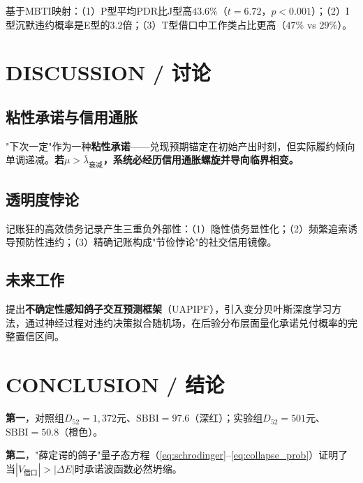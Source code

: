 \documentclass[journal]{IEEEtran}
\newcommand{\citet}[1]{\cite{#1}}
\begin{document}
基于MBTI映射：（1）P型平均$\text{PDR}$比J型高$43.6\%$（$t=6.72$，$p<0.001$）；（2）I型沉默违约概率是E型的$3.2$倍；（3）T型借口中工作类占比更高（$47\%$ vs $29\%$）。

\section{DISCUSSION / 讨论}

\subsection{粘性承诺与信用通胀}

"下次一定"作为一种\textbf{粘性承诺}——兑现预期锚定在初始产出时刻，但实际履约倾向单调递减。\textbf{若$\mu > \bar{\lambda}_{\text{衰减}}$，系统必经历信用通胀螺旋并导向临界相变。}

\subsection{透明度悖论}

记账狂的高效债务记录产生三重负外部性：（1）隐性债务显性化；（2）频繁追索诱导预防性违约；（3）精确记账构成"节俭悖论"\citet{keynes_thrift}的社交信用镜像。

\subsection{未来工作}

提出\textbf{不确定性感知鸽子交互预测框架}（UAPIPF），引入变分贝叶斯深度学习方法，通过神经过程对违约决策拟合随机场，在后验分布层面量化承诺兑付概率的完整置信区间。

\section{CONCLUSION / 结论}

\textbf{第一}，对照组$D_{52}=1,372$元、$\text{SBBI}=97.6$（深红）；实验组$D_{52}=501$元、$\text{SBBI}=50.8$（橙色）。

\textbf{第二}，"薛定谔的鸽子"量子态方程（\ref{eq:schrodinger}--\ref{eq:collapse_prob}）证明了当$|V_{\text{借口}}| > |\Delta E|$时承诺波函数必然坍缩。
\end{document}
